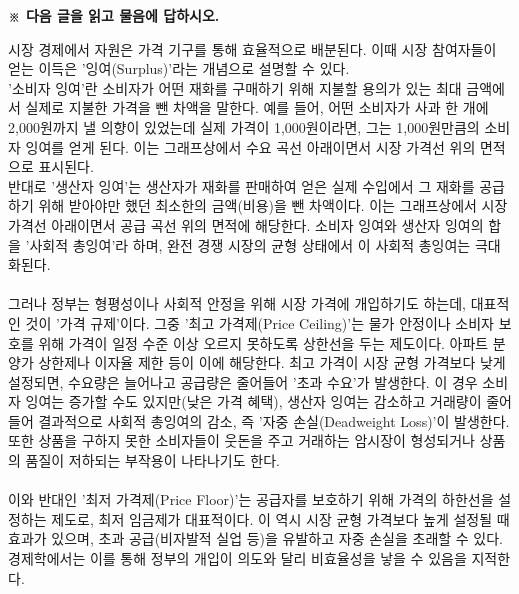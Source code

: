 \documentclass[10pt,a4paper]{article}
\begin{document}
\vspace{4mm}
{\small\textbf{※ 다음 글을 읽고 물음에 답하시오.}}
\vspace{2mm}
\begin{tcolorbox}[passage]
시장 경제에서 자원은 가격 기구를 통해 효율적으로 배분된다. 이때 시장 참여자들이 얻는 이득은 '잉여(Surplus)'라는 개념으로 설명할 수 있다.  \\{}
'소비자 잉여'란 소비자가 어떤 재화를 구매하기 위해 지불할 용의가 있는 최대 금액에서 실제로 지불한 가격을 뺀 차액을 말한다. 예를 들어, 어떤 소비자가 사과 한 개에 2,000원까지 낼 의향이 있었는데 실제 가격이 1,000원이라면, 그는 1,000원만큼의 소비자 잉여를 얻게 된다. 이는 그래프상에서 수요 곡선 아래이면서 시장 가격선 위의 면적으로 표시된다. \\{}
반대로 '생산자 잉여'는 생산자가 재화를 판매하여 얻은 실제 수입에서 그 재화를 공급하기 위해 받아야만 했던 최소한의 금액(비용)을 뺀 차액이다. 이는 그래프상에서 시장 가격선 아래이면서 공급 곡선 위의 면적에 해당한다. 소비자 잉여와 생산자 잉여의 합을 '사회적 총잉여'라 하며, 완전 경쟁 시장의 균형 상태에서 이 사회적 총잉여는 극대화된다. \\{}
\vspace{4pt} \\{}
그러나 정부는 형평성이나 사회적 안정을 위해 시장 가격에 개입하기도 하는데, 대표적인 것이 '가격 규제'이다. 그중 '최고 가격제(Price Ceiling)'는 물가 안정이나 소비자 보호를 위해 가격이 일정 수준 이상 오르지 못하도록 상한선을 두는 제도이다. 아파트 분양가 상한제나 이자율 제한 등이 이에 해당한다. 최고 가격이 시장 균형 가격보다 낮게 설정되면, 수요량은 늘어나고 공급량은 줄어들어 '초과 수요'가 발생한다. 이 경우 소비자 잉여는 증가할 수도 있지만(낮은 가격 혜택), 생산자 잉여는 감소하고 거래량이 줄어들어 결과적으로 사회적 총잉여의 감소, 즉 '자중 손실(Deadweight Loss)'이 발생한다. 또한 상품을 구하지 못한 소비자들이 웃돈을 주고 거래하는 암시장이 형성되거나 상품의 품질이 저하되는 부작용이 나타나기도 한다. \\{}
\vspace{4pt} \\{}
이와 반대인 '최저 가격제(Price Floor)'는 공급자를 보호하기 위해 가격의 하한선을 설정하는 제도로, 최저 임금제가 대표적이다. 이 역시 시장 균형 가격보다 높게 설정될 때 효과가 있으며, 초과 공급(비자발적 실업 등)을 유발하고 자중 손실을 초래할 수 있다. 경제학에서는 이를 통해 정부의 개입이 의도와 달리 비효율성을 낳을 수 있음을 지적한다.
\end{tcolorbox}
\vspace{3mm}
\end{document}
